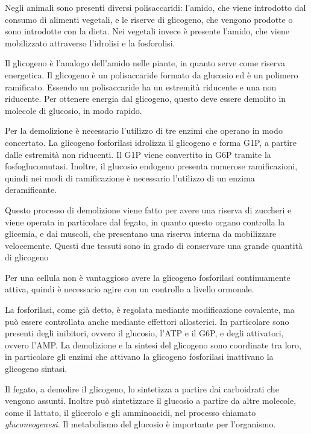 Negli animali sono presenti diversi polisaccaridi: l'amido, che viene introdotto dal consumo di alimenti vegetali, e le riserve di glicogeno, che vengono prodotte o sono introdotte con la dieta. Nei vegetali invece è presente l'amido, che viene mobilizzato attraverso l'idrolisi e la fosforolisi.

Il glicogeno è l'analogo dell'amido nelle piante, in quanto serve come riserva energetica. Il glicogeno è un polisaccaride formato da glucosio ed è un polimero ramificato. Essendo un polisaccaride ha un estremità riducente e una non riducente. Per ottenere energia dal glicogeno, questo deve essere demolito in molecole di glucosio, in modo rapido.

Per la demolizione è necessario l'utilizzo di tre enzimi che operano in modo concertato. La glicogeno fosforilasi idrolizza il glicogeno e forma G1P, a partire dalle estremità non riducenti. Il G1P viene convertito in G6P tramite la fosfoglucomutasi. Inoltre, il glucosio endogeno presenta numerose ramificazioni, quindi nei modi di ramificazione è necessario l'utilizzo di un enzima deramificante.


Questo processo di demolizione viene fatto per avere una riserva di zuccheri e viene operata in particolare dal fegato, in quanto questo organo controlla la glicemia, e dai muscoli, che presentano una riserva interna da mobilizzare velocemente.
Questi due tessuti sono in grado di conservare una grande quantità di glicogeno


Per una cellula non è vantaggioso avere la glicogeno fosforilasi continuamente attiva, quindi è necessario agire con un controllo a livello ormonale.


La fosforilasi, come già detto, è regolata mediante modificazione covalente, ma può essere controllata anche mediante effettori allosterici. In particolare sono presenti degli inibitori, ovvero il glucosio, l'ATP e il G6P, e degli attivatori, ovvero l'AMP.{}
La demolizione e la sintesi del glicogeno sono coordinate tra loro, in particolare gli enzimi che attivano la glicogeno fosforilasi inattivano la glicogeno sintasi.

Il fegato, a demolire il glicogeno, lo sintetizza a partire dai carboidrati che vengono assunti. Inoltre può sintetizzare il glucosio a partire da altre molecole, come il lattato, il glicerolo e gli amminoacidi, nel processo chiamato \emph{gluconeogenesi}. Il metabolismo del glucosio è importante per l'organismo.

